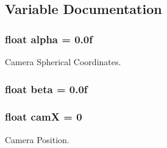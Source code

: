 \subsection{Variable Documentation}
\hypertarget{model_8cu_ab1551d8043c2aa4410fb7dbb1fe3be7b}{
\subsubsection[{alpha}]{\setlength{\rightskip}{0pt plus 5cm}float alpha = 0.\-0f}}\label{model_8cu_ab1551d8043c2aa4410fb7dbb1fe3be7b}


Camera Spherical Coordinates. 

\hypertarget{model_8cu_aa773d9a6c0ccefaa0fc9ab66fec68ec1}{
\subsubsection[{beta}]{\setlength{\rightskip}{0pt plus 5cm}float beta = 0.\-0f}}\label{model_8cu_aa773d9a6c0ccefaa0fc9ab66fec68ec1}
\hypertarget{model_8cu_a1db86c8e9928093303bdc04e7005232d}{
\subsubsection[{cam\-X}]{\setlength{\rightskip}{0pt plus 5cm}float cam\-X = 0}}\label{model_8cu_a1db86c8e9928093303bdc04e7005232d}


Camera Position. 

